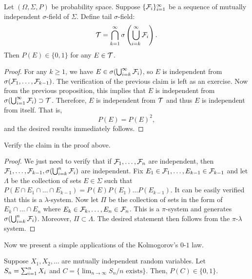 \documentclass[a4paper]{article}
\begin{document}
\begin{thm}
  Let $(\Omega, \Sigma, P)$ be probability space.
  Suppose $\{ \mathcal{F}_i \}_{i=1}^\infty$ be a sequence of mutually independent
  $\sigma$-field of $\Sigma$.
  Define tail $\sigma$-field:
  \[
    \mathcal{T} = \bigcap_{k=1}^\infty \sigma \left( \bigcup_{i=k}^\infty \mathcal{F}_i \right).
  \]
  Then $P(E) \in \{0, 1\}$ for any $E \in \mathcal{T}$.
\end{thm}

\begin{proof}
  For any $k \geq 1$, we have $E \in \sigma (\bigcup_{i=k}^\infty \mathcal{F}_i)$,
  so $E$ is independent from $\sigma (\mathcal{F}_1, \dots, \mathcal{F}_{k - 1})$.
  The verification of the previous claim is left as an exercise.
  Now from the previous proposition,
  this implies that $E$ is independent from $\sigma (\bigcup_{i=1}^\infty \mathcal{F}_i)
    \supset \mathcal{T}$. Therefore, $E$ is independent from $\mathcal{T}$
  and thus $E$ is independent from itself. That is,
  \[
    P(E) = P(E)^2,
  \]
  and the desired results immediately follows.

\end{proof}

\begin{ex}
  Verify the claim in the proof above.
\end{ex}

\begin{proof}
  We just need to verify that if $\mathcal{F}_1, \dots, \mathcal{F}_n$ are
  independent, then $\mathcal{F}_1, \dots, \mathcal{F}_{k - 1},
    \sigma (\bigcup_{i = k}^n \mathcal{F}_i)$ are independent.
  Fix $E_1 \in \mathcal{F}_1, \dots, E_{k - 1} \in \mathcal{F}_{k - 1}$
  and let $\Lambda$ be the collection of sets $E \in \Sigma$ such
  that $P (E \cap E_1 \cap \dots \cap E_{k - 1})
    = P(E) P (E_1) \dots P(E_{k - 1})$.
  It can be easily verified that this is a $\lambda$-system.
  Now let $\Pi$ be the collection of sets in the form
  of $E_k \cap \dots \cap E_n$ where
  $E_k \in \mathcal{F}_k, \dots, E_n \in \mathcal{F}_n$.
  This is a $\pi$-system and generates $\sigma (\bigcup_{i=k}^n
    \mathcal{F}_i)$. Moreover, $\Pi \subset \Lambda$.
  The desired statement then follows from the $\pi$-$\lambda$ system.

\end{proof}

Now we present a simple applications of the Kolmogorov's $0$-$1$ law.

\begin{prop}
  Suppose $X_1, X_2, \dots$ are mutually independent random
  variables. Let $S_n = \sum_{i=1}^n X_i$ and
  $C = \{ \lim_{n \to \infty} S_n / n \text{ exists} \}$.
  Then, $P (C) \in \{ 0, 1 \}$.
\end{prop}
\end{document}

